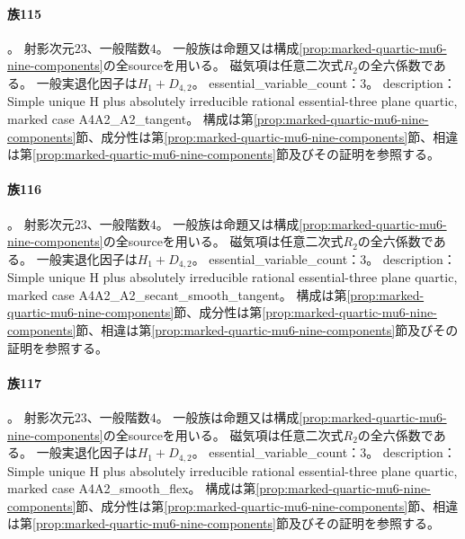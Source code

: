 \paragraph{族115}\label{catalogue:R4_MARKED_QUARTIC_MU6_A4A2_A2_TANGENT_23}
。
射影次元$23$、一般階数$4$。
一般族は命題又は構成\ref{prop:marked-quartic-mu6-nine-components}の全sourceを用いる。
磁気項は任意二次式$R_2$の全六係数である。
一般実退化因子は$H_{1}+D_{4,2}$。
essential\_variable\_count：3。
description：Simple unique H plus absolutely irreducible rational essential-three plane quartic, marked case A4A2\_A2\_tangent。
構成は第\ref{prop:marked-quartic-mu6-nine-components}節、成分性は第\ref{prop:marked-quartic-mu6-nine-components}節、相違は第\ref{prop:marked-quartic-mu6-nine-components}節及びその証明を参照する。

\paragraph{族116}\label{catalogue:R4_MARKED_QUARTIC_MU6_A4A2_A2_SECANT_SMOOTH_TANGENT_23}
。
射影次元$23$、一般階数$4$。
一般族は命題又は構成\ref{prop:marked-quartic-mu6-nine-components}の全sourceを用いる。
磁気項は任意二次式$R_2$の全六係数である。
一般実退化因子は$H_{1}+D_{4,2}$。
essential\_variable\_count：3。
description：Simple unique H plus absolutely irreducible rational essential-three plane quartic, marked case A4A2\_A2\_secant\_smooth\_tangent。
構成は第\ref{prop:marked-quartic-mu6-nine-components}節、成分性は第\ref{prop:marked-quartic-mu6-nine-components}節、相違は第\ref{prop:marked-quartic-mu6-nine-components}節及びその証明を参照する。

\paragraph{族117}\label{catalogue:R4_MARKED_QUARTIC_MU6_A4A2_SMOOTH_FLEX_23}
。
射影次元$23$、一般階数$4$。
一般族は命題又は構成\ref{prop:marked-quartic-mu6-nine-components}の全sourceを用いる。
磁気項は任意二次式$R_2$の全六係数である。
一般実退化因子は$H_{1}+D_{4,2}$。
essential\_variable\_count：3。
description：Simple unique H plus absolutely irreducible rational essential-three plane quartic, marked case A4A2\_smooth\_flex。
構成は第\ref{prop:marked-quartic-mu6-nine-components}節、成分性は第\ref{prop:marked-quartic-mu6-nine-components}節、相違は第\ref{prop:marked-quartic-mu6-nine-components}節及びその証明を参照する。

